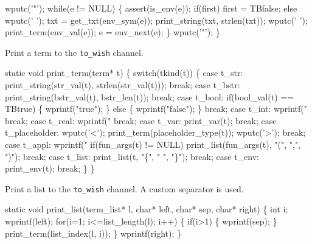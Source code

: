    wputc('"');
   while(e != NULL)
   \{
      assert(is_env(e));
      if(first)
        first = TBfalse;
      else
        wputc(' ');
      txt = get_txt(env_sym(e));
      print_string(txt, strlen(txt));
      wputc(' ');
      print_term(env_val(e));
      e = env_next(e);
   \}
   wputc('"');
\}
\nwendcode{}\nwdocspar



Print a term to the {\tt to\_wish} channel.

\nwenddocs{}\endmoddef\let\nwnotused=\nwoutput{}
static void print_term(term* t)
\{
   switch(tkind(t))
   \{
      case t_str:
         print_string(str_val(t), strlen(str_val(t)));
         break;
      case t_bstr:
         print_string(bstr_val(t), bstr_len(t));
         break;
      case t_bool:
         if(bool_val(t) == TBtrue) \{
            wprintf("true");
         \} else \{
            wprintf("false");
         \}
         break;
      case t_int:
         wprintf("%
         break;
      case t_real:
         wprintf("%
         break;
      case t_var:
         print_var(t);
         break;
      case t_placeholder:
         wputc('<');
         print_term(placeholder_type(t));
         wputc('>');
         break;
      case t_appl:
         wprintf("%
         if(fun_args(t) != NULL)
            print_list(fun_args(t), "(", ",", ")");
         break;
      case t_list:
         print_list(t, "\{", " ", "\}");
         break;
      case t_env:
         print_env(t);
         break;
   \}
\}
\nwendcode{}\nwdocspar


Print a list to the {\tt to\_wish} channel. A custom separator is used.

\nwenddocs{}\endmoddef\let\nwnotused=\nwoutput{}
static void print_list(term_list* l, char* left, char* sep, char* right)
\{
   int i;
   wprintf(left);
   for(i=1; i<=list_length(l); i++) \{
      if(i>1) \{
         wprintf(sep);
      \}
      print_term(list_index(l, i));
   \}
   wprintf(right);
\}
\nwendcode{}\nwdocspar


